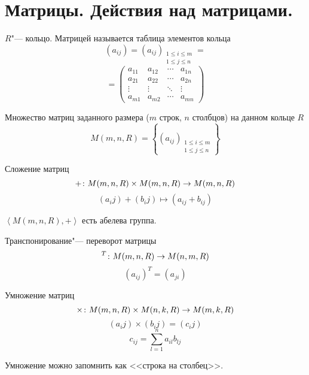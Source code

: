 \section{Матрицы. Действия над матрицами.}

\begin{Def}
$R$"--- кольцо. Матрицей называется таблица элементов кольца
$$(a_{ij}) = (a_{ij})_{\substack{1 \leqslant i \leqslant m \\ 1 \leqslant j \leqslant n}} = $$
$$ = \left(\begin{matrix}
a_{11} & a_{12} & \cdots & a_{1n} \\
a_{21} & a_{22} & \cdots & a_{2n} \\
\vdots & \vdots & \ddots & \vdots \\
a_{m1} & a_{m2} & \cdots & a_{mn}
\end{matrix}\right)$$
\end{Def}

\begin{Def}
Множество матриц заданного размера ($m$ строк, $n$ столбцов) на данном кольце $R$
$$M(m, n, R) = \left\{(a_{ij})_{\substack{1 \leqslant i \leqslant m \\ 1 \leqslant j \leqslant n}}\right\}$$
\end{Def}

\begin{Def}
Сложение матриц
$$+\colon M(m, n, R) \times M(m, n, R) \rightarrow M(m, n, R)$$
$$(a_ij) + (b_ij) \mapsto (a_{ij} + b_{ij})$$
\end{Def}

\begin{lemma}
$\left<M(m, n, R), +\right>$ есть абелева группа.
\end{lemma}

\begin{Def}
Транспонирование"--- переворот матрицы
$${}^T\colon M(m, n, R) \rightarrow M(n, m, R)$$
$$(a_{ij})^T = (a_{ji})$$
\end{Def}

\begin{Def}
Умножение матриц
$$\times\colon M(m, n, R) \times M(n, k, R) \rightarrow M(m, k, R)$$
$$(a_ij) \times (b_ij) = (c_ij)$$
$$c_{ij} = \sum_{l=1}^{n} a_{il}b_{lj}$$
\end{Def}

Умножение можно запомнить как <<строка на столбец>>.

